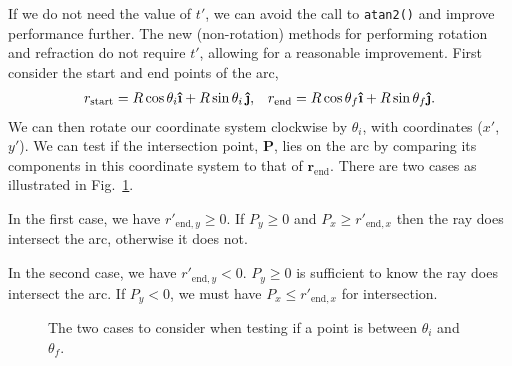 \documentclass{article}
\let\vec \bm
\newcommand{\uveci}{{\bm{\hat{\textnormal{\bfseries\i}}}}}
\newcommand{\uvecj}{{\bm{\hat{\textnormal{\bfseries\j}}}}}
\newcommand{\mrm}[1]{\mathrm{#1}}
\begin{document}
If we do not need the value of $t'$, we can avoid the call to \texttt{atan2()} and improve performance further. The new (non-rotation) methods for performing rotation and refraction do not require $t'$, allowing for a reasonable improvement. First consider the start and end points of the arc,
\begin{align}
    r_\mrm{start} = R \cos \theta_i \uveci + R \sin \theta_i \, \uvecj,
    &&
    r_\mrm{end} = R \cos \theta_f \uveci + R \sin \theta_f \uvecj.
\end{align}
We can then rotate our coordinate system clockwise by $\theta_i$, with coordinates ($x'$, $y'$). We can test if the intersection point, $\vec{P}$, lies on the arc by comparing its components in this coordinate system to that of $\vec{r}_\mrm{end}$. There are two cases as illustrated in Fig.~\ref{fig:avoind_atan2}.

In the first case, we have $r'_{\mrm{end},y} \geq 0$. If $P_y \geq 0$ and $P_x \geq r'_{\mrm{end},x}$ then the ray does intersect the arc, otherwise it does not.

In the second case, we have $r'_{\mrm{end},y} < 0$. $P_y \geq 0$ is sufficient to know the ray does intersect the arc. If $P_y < 0$, we must have 
$P_x \leq r'_{\mrm{end},x}$ for intersection.

\begin{figure}
    \centering
    \begin{subfigure}[b]{0.49\textwidth}
         \centering
     \end{subfigure}
    \hfill
    \begin{subfigure}[b]{0.49\textwidth}
         \centering
     \end{subfigure}
    \caption{The two cases to consider when testing if a point is between $\theta_i$ and $\theta_f$. }
    \label{fig:avoind_atan2}
\end{figure}
\end{document}
